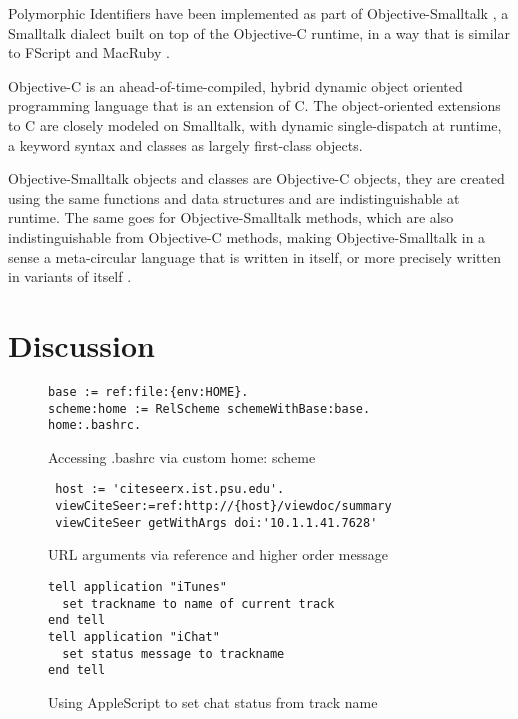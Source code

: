 \documentclass[preprint,authoryear]{acm_proc_article-sp}
\begin{document}
Polymorphic Identifiers have been implemented as part of Objective-Smalltalk \cite{objst},
a Smalltalk dialect built on top of the Objective-C\cite{objc-evol}\cite{objc-apple} runtime, 
in a way that is similar to FScript\cite{fscript} and MacRuby \cite{macruby}.

Objective-C is an ahead-of-time-compiled, hybrid dynamic object oriented programming language
that is an extension of C.  The object-oriented extensions to C are closely modeled on
Smalltalk, with dynamic single-dispatch at runtime, a keyword syntax and classes as
largely first-class objects.

Objective-Smalltalk objects and classes are Objective-C objects, they are created using
the same functions and data structures and are indistinguishable at runtime.
The same goes for Objective-Smalltalk methods, which are also indistinguishable from
Objective-C methods, making Objective-Smalltalk in a sense a meta-circular language
that is written in itself, or more precisely written in variants of itself \cite{kleinvm}\cite{squeak}.


\section{Discussion}



\begin{figure}[htbp]
\begin{center}
\begin{verbatim}
base := ref:file:{env:HOME}.
scheme:home := RelScheme schemeWithBase:base.
home:.bashrc.
\end{verbatim}
\caption{Accessing .bashrc via custom home: scheme}
\label{rfc-scheme}
\end{center}
\end{figure}




\begin{figure}[htbp]
\begin{center}
\begin{verbatim}
 host := 'citeseerx.ist.psu.edu'.
 viewCiteSeer:=ref:http://{host}/viewdoc/summary
 viewCiteSeer getWithArgs doi:'10.1.1.41.7628'
\end{verbatim}
\caption{URL arguments via reference and higher order message}
\label{url-args}
\end{center}
\end{figure}




\begin{figure}[htbp]
\begin{center}
\begin{verbatim}
tell application "iTunes"
  set trackname to name of current track
end tell
tell application "iChat"
  set status message to trackname
end tell
\end{verbatim}
\caption{Using AppleScript to set chat status from track name}
\label{AppleScript}
\end{center}
\end{figure}
\end{document}
